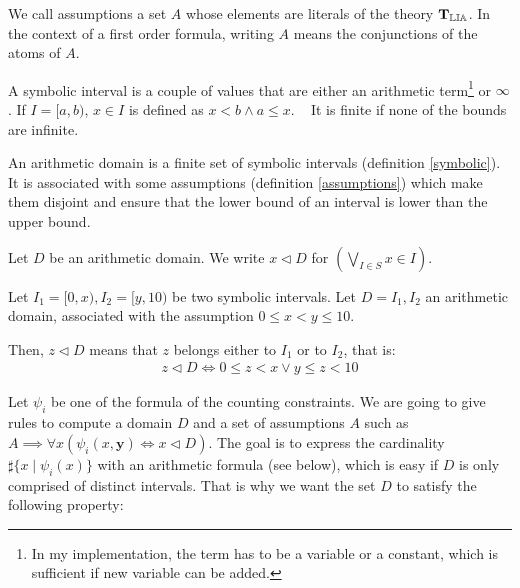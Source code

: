 \begin{definition}[Assumptions]

We call assumptions a set $A$ whose elements are literals of the theory
$\operatorname{\mathbf{T}_{\mathbb{LIA}}}$. In the context of a first order formula, writing $A$
means the conjunctions of the atoms of $A$.

\label{assumptions}

\end{definition}


\begin{definition}

A symbolic interval is a couple of values that are either an arithmetic
term\footnote{In my implementation, the term has to be a variable or a constant,
which is sufficient if new variable can be added.} or $\infty$. If $I = [a, b)$, $x \in I$ is
defined as $x < b \land a \le x$. \newline~\newline
It is finite if none of the bounds are infinite.

\label{symbolic}

\end{definition}


\begin{definition}

An arithmetic domain is a finite set of symbolic intervals (definition
\ref{symbolic}). It is  associated with some assumptions
(definition \ref{assumptions}) which make them disjoint and ensure that
the lower bound of an interval is lower than the upper bound.

\label{arithmetic}

\end{definition}

Let $D$ be an arithmetic domain. We write $x \lhd D$ for
$\left(\bigvee\limits_{I \in S} x \in I\right)$.

\begin{example}
Let $I_1 = [0, x), I_2 = [y, 10)$ be two symbolic intervals. Let $D = {I_1, I_2}$
an arithmetic domain, associated with the assumption $0 \leq x < y \leq 10$.

Then, $z \lhd D$ means that $z$ belongs either to $I_1$ or to $I_2$, that is:
\begin{align*} z \lhd D \iff 0 \leq z < x \lor y \leq z < 10\end{align*}
\end{example}

Let $\psi_i$ be one of the formula of the counting constraints. We are going to
give rules to compute a domain $D$ and a set of assumptions $A$ such as
$A \implies \forall x \left(\psi_i(x, \mathbf{y}) \iff x \lhd D\right)$. The goal is to express the
cardinality $\sharp\{x \mid \psi_i(x)\}$ with an arithmetic formula (see below), which is easy if $D$ is only
comprised of distinct intervals. That is why we want the set $D$
to satisfy the following property:


